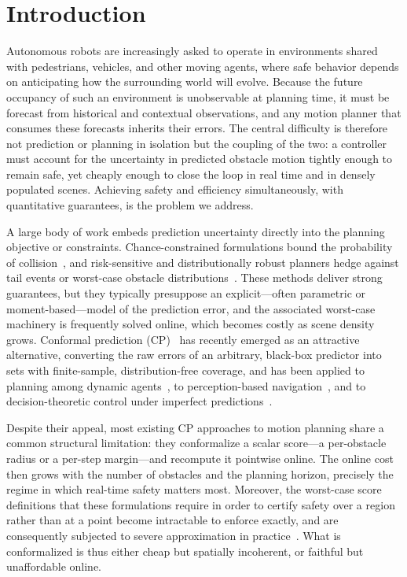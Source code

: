 \documentclass[lettersize,journal]{IEEEtran}
\begin{document}
\section{Introduction}
Autonomous robots are increasingly asked to operate in environments shared with pedestrians, vehicles, and other moving agents, where safe behavior depends on anticipating how the surrounding world will evolve. Because the future occupancy of such an environment is unobservable at planning time, it must be forecast from historical and contextual observations, and any motion planner that consumes these forecasts inherits their errors. The central difficulty is therefore not prediction or planning in isolation but the coupling of the two: a controller must account for the uncertainty in predicted obstacle motion tightly enough to remain safe, yet cheaply enough to close the loop in real time and in densely populated scenes. Achieving safety and efficiency simultaneously, with quantitative guarantees, is the problem we address.

A large body of work embeds prediction uncertainty directly into the planning objective or constraints. Chance-constrained formulations bound the probability of collision~\cite{blackmore2011chance}, and risk-sensitive and distributionally robust planners hedge against tail events or worst-case obstacle distributions~\cite{hakobyan2019risk,fan2021step,hakobyan2021wasserstein}. These methods deliver strong guarantees, but they typically presuppose an explicit—often parametric or moment-based—model of the prediction error, and the associated worst-case machinery is frequently solved online, which becomes costly as scene density grows. Conformal prediction (CP)~\cite{vovk2005algorithmic,angelopoulos2023conformal,gibbs2021adaptive} has recently emerged as an attractive alternative, converting the raw errors of an arbitrary, black-box predictor into sets with finite-sample, distribution-free coverage, and has been applied to planning among dynamic agents~\cite{lindemann2023safeplanning,dixit2023adaptive}, to perception-based navigation~\cite{mei2025perceive}, and to decision-theoretic control under imperfect predictions~\cite{lekeufack2024decision,contreras2025safe}.


Despite their appeal, most existing CP approaches to motion planning share a common structural limitation: they conformalize a scalar score—a per-obstacle radius or a per-step margin—and recompute it pointwise online. The online cost then grows with the number of obstacles and the planning horizon, precisely the regime in which real-time safety matters most. Moreover, the worst-case score definitions that these formulations require in order to certify safety over a region rather than at a point become intractable to enforce exactly, and are consequently subjected to severe approximation in practice~\cite{mei2025perceive,sundarsingh2026safe}. What is conformalized is thus either cheap but spatially incoherent, or faithful but unaffordable online.
\end{document}
